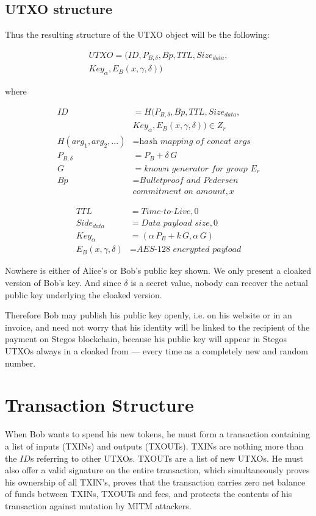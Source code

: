 \documentclass[8pt,fleqn,openany]{book}
\begin{document}
{\subsection{UTXO structure}
Thus the resulting structure of the UTXO object will be the following:

\begin{multline*}
UTXO = (ID, P_{B, \delta}, Bp, TTL, Size_{data},\\
        Key_{\alpha}, E_B(x, \gamma, \delta))
\end{multline*}

where

\begin{align*}
ID &= H(P_{B, \delta}, Bp, TTL, Size_{data}, \\ 
   & Key_{\alpha}, E_B(x, \gamma, \delta)) \in Z_r \\
H(arg_1, arg_2, ...) &= \textit{hash mapping of concat args} \\
P_{B, \delta} &= P_B + \delta \, G \\
G &= \textit{known generator for group } E_r \\
Bp &= \textit{Bulletproof and Pedersen} \\
& \textit{commitment on amount}, x 
\end{align*}

\begin{align*}
TTL &= \textit{Time-to-Live}, 0 \\
Side_{data} &= \textit{Data payload size}, 0 \\
Key_{\alpha} &= (\alpha \, P_{B} + k \, G, \alpha \, G ) \\
E_B(x, \gamma, \delta) &= \textit{AES-128 encrypted payload}
\end{align*}

Nowhere is either of Alice’s or Bob’s public key shown. We only present a cloaked version of Bob’s key. And since $\delta$ is a secret value, nobody can recover the actual public key underlying the cloaked version. 

Therefore Bob may publish his public key openly, i.e. on his website or in an invoice, and need not worry that his identity will be linked to the recipient of the payment on Stegos blockchain, because his public key will appear in Stegos UTXOs always in a cloaked from — every time as a completely new and random number.

\section{Transaction Structure}
When Bob wants to spend his new tokens, he must form a transaction containing a list of inputs (TXINs) and outputs (TXOUTs). TXINs are nothing more than the $\mathit{ID}$s referring to other UTXOs. TXOUTs are a list of new UTXOs. He must also offer a valid signature on the entire transaction, which simultaneously proves his ownership of all TXIN’s, proves that the transaction carries zero net balance of funds between TXINs, TXOUTs and fees, and protects the contents of his transaction against mutation by MITM attackers.

}
\end{document}
